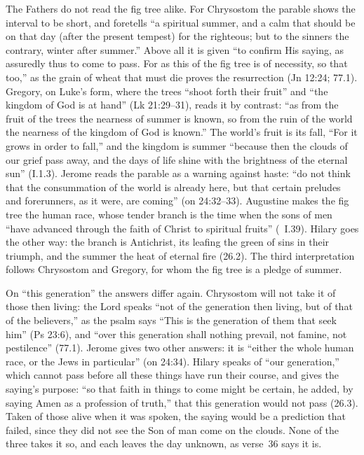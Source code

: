 The Fathers do not read the fig tree alike. For Chrysostom the parable shows
the interval to be short, and foretells ``a spiritual summer, and a calm that
should be on that day (after the present tempest) for the righteous; but to
the sinners the contrary, winter after summer.'' Above all it is given ``to
confirm His saying, as assuredly thus to come to pass. For as this of the fig
tree is of necessity, so that too,'' as the grain of wheat that must die
proves the resurrection (Jn 12:24; 77.1). Gregory, on Luke's form, where the
trees ``shoot forth their fruit'' and ``the kingdom of God is at hand'' (Lk
21:29--31), reads it by contrast: ``as from the fruit of the trees the
nearness of summer is known, so from the ruin of the world the nearness of
the kingdom of God is known.'' The world's fruit is its fall, ``For it grows
in order to fall,'' and the kingdom is summer ``because then the clouds of our
grief pass away, and the days of life shine with the brightness of the eternal
sun'' (I.1.3). Jerome reads the parable as a warning against haste: ``do not
think that the consummation of the world is already here, but that certain
preludes and forerunners, as it were, are coming'' (on 24:32--33). Augustine
makes the fig tree the human race, whose tender branch is the time when the
sons of men ``have advanced through the faith of Christ to spiritual fruits''
(~I.39). Hilary goes the other way: the branch
is Antichrist, its leafing the green of sins in their triumph, and the summer
the heat of eternal fire (26.2). The third interpretation follows Chrysostom
and Gregory, for whom the fig tree is a pledge of summer.

On ``this generation'' the answers differ again. Chrysostom will not take it of
those then living: the Lord speaks ``not of the generation then living, but of
that of the believers,'' as the psalm says ``This is the generation of them
that seek him'' (Ps 23:6), and ``over this generation shall nothing prevail,
not famine, not pestilence'' (77.1). Jerome gives two other answers: it is
``either the whole human race, or the Jews in particular'' (on 24:34). Hilary
speaks of ``our generation,'' which cannot pass before all these things have
run their course, and gives the saying's purpose: ``so that faith in things to
come might be certain, he added, by saying Amen as a profession of truth,''
that this generation would not pass (26.3). Taken of those alive when it was
spoken, the saying would be a prediction that failed, since they did not see
the Son of man come on the clouds. None of the three takes it so, and each
leaves the day unknown, as verse~36 says it is.


